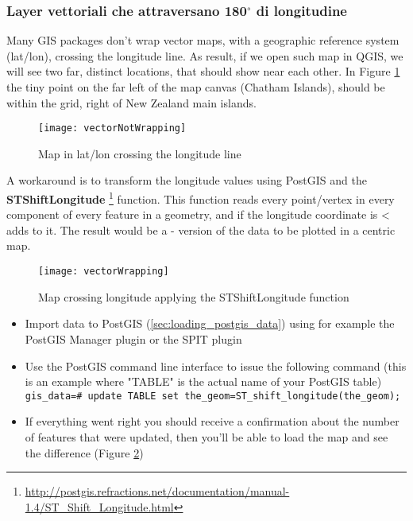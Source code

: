 \subsubsection{Layer vettoriali che attraversano 180$^\circ$ di longitudine}

Many GIS packages don't wrap vector maps, with a geographic reference system
(lat/lon), crossing the  longitude line. As result, if
we open such map in QGIS, we will see two far, distinct locations, that
should show near each other. In Figure \ref{fig:vector_not_wrapping} the tiny
point on the far left of the map canvas (Chatham Islands), should be within
the grid, right of New Zealand main islands.

\begin{figure}[ht]
   \begin{center}
   \caption{Map in lat/lon crossing the  longitude line
   \nixcaption}
   \label{fig:vector_not_wrapping}\smallskip
   \texttt{[image: vectorNotWrapping]}
\end{center}
\end{figure}

A workaround is to transform the longitude values using PostGIS and the
\textbf{ST\textunderscore Shift\textunderscore Longitude}
\footnote{\url{http://postgis.refractions.net/documentation/manual-1.4/ST_Shift_Longitude.html}}
function. This function reads every point/vertex in every component of every
feature in a geometry, and if the longitude coordinate is <  adds
 to it. The result would be a  -  version of
the data to be plotted in a  centric map.

\begin{figure}[ht]
   \begin{center}
   \caption{Map crossing  longitude applying the ST\textunderscore Shift\textunderscore Longitude function \nixcaption}
\label{fig:vector_wrapping}\smallskip
   \texttt{[image: vectorWrapping]}
\end{center}
\end{figure}


\begin{itemize}
\item Import data to PostGIS (\ref{sec:loading_postgis_data}) using for
example the PostGIS Manager plugin or the SPIT plugin
\item Use the PostGIS command line interface to issue the following command
(this is an example where "TABLE" is the actual name of your PostGIS table) \\ 
\texttt{gis\_data=\# update TABLE set the\_geom=ST\_shift\_longitude(the\_geom);} 
\item If everything went right you should receive a confirmation about the
number of features that were updated, then you'll be able to load the map and
see the difference (Figure \ref{fig:vector_wrapping})
\end{itemize}

